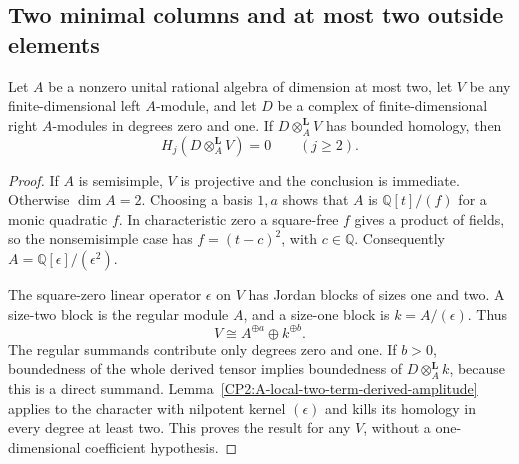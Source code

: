 \subsection{Two minimal columns and at most two outside elements}

\begin{lemma}
\label{CP2:A-two-dimensional-two-term-coefficients}
Let $A$ be a nonzero unital rational algebra of dimension at most two,
let $V$ be any finite-dimensional left $A$-module, and let $D$ be a
complex of finite-dimensional right $A$-modules in degrees zero and one.
If $D\otimes_A^{\mathbf L}V$ has bounded homology, then
\[
 H_j(D\otimes_A^{\mathbf L}V)=0\qquad(j\ge2).
\]
\end{lemma}
\begin{proof}
If $A$ is semisimple, $V$ is projective and the conclusion is immediate.
Otherwise $\dim A=2$.  Choosing a basis $1,a$ shows that $A$ is
$\mathbb Q[t]/(f)$ for a monic quadratic $f$.
In characteristic zero a square-free $f$ gives a product of fields,
so the nonsemisimple case has $f=(t-c)^2$, with $c\in\mathbb Q$.
Consequently $A=\mathbb Q[\epsilon]/(\epsilon^2)$.

The square-zero linear operator $\epsilon$ on $V$ has Jordan blocks
of sizes one and two.  A size-two block is the regular module $A$,
and a size-one block is $k=A/(\epsilon)$.  Thus
\[
 V\cong A^{\oplus a}\oplus k^{\oplus b}.
\]
The regular summands contribute only degrees zero and one.
If $b>0$, boundedness of the whole derived tensor implies boundedness
of $D\otimes_A^{\mathbf L}k$, because this is a direct summand.
Lemma~\ref{CP2:A-local-two-term-derived-amplitude} applies to the
character with nilpotent kernel $(\epsilon)$ and kills its homology
in every degree at least two.  This proves the result for any $V$,
without a one-dimensional coefficient hypothesis.
\end{proof}

